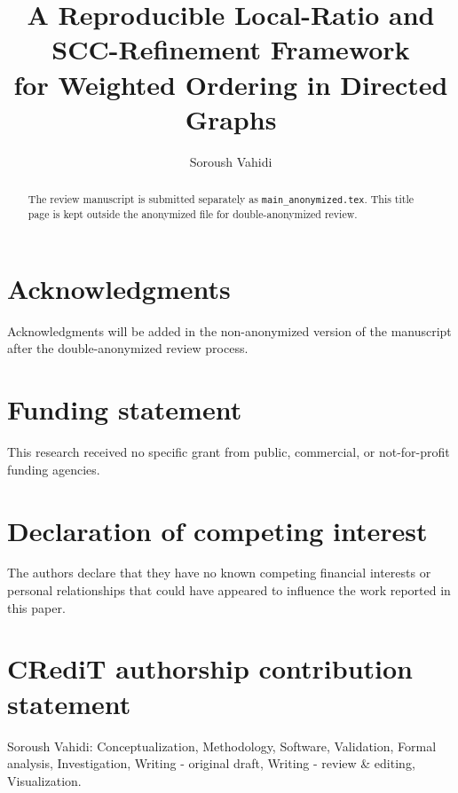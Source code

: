 \documentclass[preprint,12pt,authoryear]{elsarticle}
\begin{document}
\begin{frontmatter}

\title{A Reproducible Local-Ratio and SCC-Refinement Framework\\ for Weighted Ordering in Directed Graphs}

\author[aff1]{Soroush Vahidi}
\address[aff1]{Department of Computer Science, New Jersey Institute of Technology, Newark, NJ, USA}


\begin{abstract}
The review manuscript is submitted separately as \texttt{main\_anonymized.tex}. This title page is kept outside the anonymized file for double-anonymized review.
\end{abstract}

\end{frontmatter}

\section*{Acknowledgments}
Acknowledgments will be added in the non-anonymized version of the manuscript after the double-anonymized review process.

\section*{Funding statement}
This research received no specific grant from public, commercial, or not-for-profit funding agencies.

\section*{Declaration of competing interest}
The authors declare that they have no known competing financial interests or personal relationships that could have appeared to influence the work reported in this paper.

\section*{CRediT authorship contribution statement}
Soroush Vahidi: Conceptualization, Methodology, Software, Validation, Formal analysis, Investigation, Writing - original draft, Writing - review \& editing, Visualization.
\end{document}
